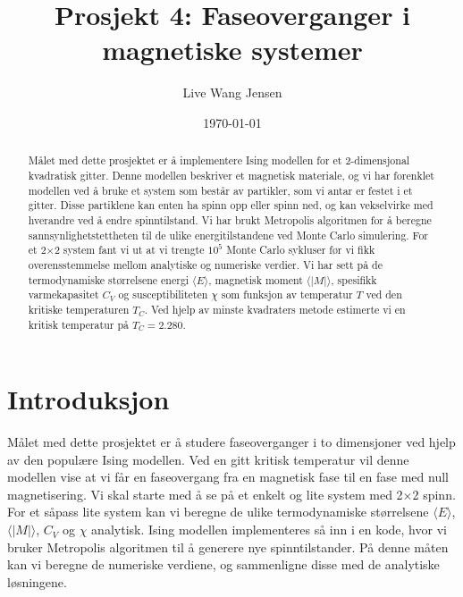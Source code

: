 \documentclass[11pt,a4paper]{article}
\begin{document}
\title{Prosjekt 4: Faseoverganger i magnetiske systemer }
\author{Live Wang Jensen}
\date{\today}

\maketitle

\begin{abstract}
Målet med dette prosjektet er å implementere Ising modellen for et 2-dimensjonal kvadratisk gitter. Denne modellen beskriver et magnetisk materiale, og vi har forenklet modellen ved å bruke et system som består av partikler, som vi antar er festet i et gitter. Disse partiklene kan enten ha spinn opp eller spinn ned, og kan vekselvirke med hverandre ved å endre spinntilstand. Vi har brukt Metropolis algoritmen for å beregne sannsynlighetstettheten til de ulike energitilstandene ved Monte Carlo simulering. For et 2$\times$2 system fant vi ut at vi trengte $10^5$ Monte Carlo sykluser før vi fikk overensstemmelse mellom analytiske og numeriske verdier. Vi har sett på de termodynamiske størrelsene energi $\langle E \rangle$, magnetisk moment $\langle |M| \rangle$, spesifikk varmekapasitet $C_V$ og susceptibiliteten $\chi$ som funksjon av temperatur $T$ ved den kritiske temperaturen $T_C$. Ved hjelp av minste kvadraters metode estimerte vi en kritisk temperatur på $T_C = 2.280$.

\end{abstract}

\tableofcontents

\clearpage
\section{Introduksjon}
Målet med dette prosjektet er å studere faseoverganger i to dimensjoner ved hjelp av den populære Ising modellen. Ved en gitt kritisk temperatur vil denne modellen vise at vi får en faseovergang fra en magnetisk fase til en fase med null magnetisering. Vi skal starte med å se på et enkelt og lite system med 2$\times$2 spinn. For et såpass lite system kan vi beregne de ulike termodynamiske størrelsene $\langle E \rangle$, $\langle |M| \rangle$, $C_V$ og $\chi$ analytisk. Ising modellen implementeres så inn i en kode, hvor vi bruker Metropolis algoritmen til å generere nye spinntilstander. På denne måten kan vi beregne de numeriske verdiene, og sammenligne disse med de analytiske løsningene. 
\end{document}
